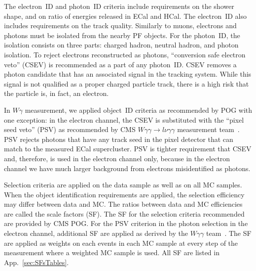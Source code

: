 
The electron~ID and photon~ID criteria include requirements on the shower shape, and on ratio of energies released in ECal and HCal. The electron~ID also includes requirements on the track quality. Similarly to muons, electrons and photons must be isolated from the nearby PF objects. For the photon~ID, the isolation consists on three parts: charged hadron, neutral hadron, and photon isolation. To reject electrons reconstructed as photons, ``conversion safe electron veto'' (CSEV) is recommended as a part of any photon~ID. CSEV removes a photon candidate that has an associated signal in the tracking system. While this signal is not qualified as a proper charged particle track, there is a high risk that the particle is, in fact, an electron.



In $W\gamma$ measurement, we applied object~ID criteria as recommended by POG with one exception: in the electron channel, the CSEV is substituted with the ``pixel seed veto'' (PSV) as recommended by CMS $W\gamma\gamma \rightarrow l\nu\gamma\gamma$ measurement team~\cite{ref_Wgg8TeV}. PSV rejects photons that have any track seed in the pixel detector that can match to the measured ECal supercluster. PSV is tighter requirement that CSEV and, therefore, is used in the electron channel only, because in the electron channel we have much larger background from electrons misidentified as photons. %

Selection criteria are applied on the data sample as well as on all MC samples. When the object identification requirements are applied, the selection efficiency may differ between data and MC. The ratios between data and MC efficiencies are called the scale factors (SF). The SF for the selection criteria recommended are provided by CMS POG. For the PSV criterion in the photon selection in the electron channel, additional SF are applied as derived by the $W\gamma\gamma$ team~\cite{ref_Wgg8TeV}. The SF are applied as weights on each events in each MC sample at every step of the measurement where a weighted MC sample is used. All SF are listed in App.~\ref{sec:SFsTables}.

